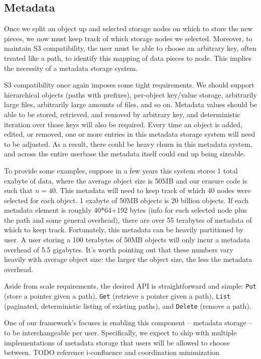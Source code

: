 \documentclass[a4paper,10pt]{article} \usepackage[utf8]{inputenc}
\newcommand{\x}[1]{{\tt #1}} \newcommand{\code}[1]{{\tt #1}}
\newcommand{\todo}[1]{{\color{red} TODO #1 }}
\begin{document}
\subsection{Metadata}

Once we split an object up and selected storage nodes on which to store the
new pieces, we now must keep track of which storage nodes we selected.
Moreover, to maintain S3 compatibility, the user must be able to choose an
arbitrary key, often treated like a path, to identify this mapping of data
pieces to node. This implies the necessity of a metadata storage system.

S3 compatibility once again imposes some tight requirements.
We should support
hierarchical objects (paths with prefixes), per-object key/value storage,
arbitrarily large files, arbitrarily large amounts of files, and so on.
Metadata values
should be able to be stored, retrieved, and removed by arbitrary key, and
deterministic iteration over those keys will also be required. Every time an
object is added, edited, or removed, one or more entries in this metadata
storage system will need to be adjusted. As a result, there could be heavy churn
in this metadata system, and across the entire userbase the metadata itself
could end up being sizeable.

To provide some examples, suppose in
a few years this system stores 1 total exabyte of data, where the average object
size is 50MB and our erasure code is such that $n=40$. This metadata will need
to keep track of which 40 nodes were selected for each object.
1 exabyte of 50MB objects is 20 billion objects. If
each metadata element is roughly 40*64+192 bytes (info for each selected node
plus the path and some general overhead), there are over 55 terabytes of
metadata of which to keep track.
Fortunately, this metadata can be heavily partitioned by user. A user storing a
100 terabytes of 50MB objects will only incur a metadata overhead of 5.5
gigabytes. It's worth pointing out that these numbers vary
heavily with average object size: the larger the object size, the less the
metadata overhead.

Aside from scale requirements, the desired API is straightforward and
simple: \x{Put} (store a pointer given a path), \x{Get} (retrieve a pointer
given a path),
\x{List} (paginated, deterministic listing of existing paths), and \x{Delete}
(remove a path).

One of our framework's focuses is enabling this component -- metadata
storage -- to be interchangeable per user. Specifically, we expect to ship with
multiple implementations of metadata storage that users will be allowed to
choose between. \todo{reference i-confluence and coordination minimization}
\end{document}
